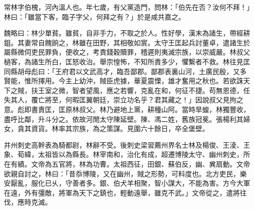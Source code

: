 
\begin{pinyinscope}
常林字伯槐，河內溫人也。年七歲，有父黨造門，問林：「伯先在否？汝何不拜！」林曰：「雖當下客，臨子字父，何拜之有？」於是咸共嘉之。

魏略曰：林少單貧。雖貧，自非手力，不取之於人。性好學，漢末為諸生，帶經耕鉏。其妻常自餽餉之，林雖在田野，其相敬如賔。太守王匡起兵討董卓，遣諸生於屬縣微伺吏民罪負，便收之，考責錢穀贖罪，稽遲則夷滅宗族，以崇威嚴。林叔父檛客，為諸生所白，匡怒收治。舉宗惶怖，不知所責多少，懼繫者不救。林往見匡同縣胡母彪曰：「王府君以文武高才，臨吾鄙郡。鄙郡表裏山河，土廣民殷，又多賢能，惟所擇用。今主上幼沖，賊臣虎據，華夏震慄，雄才奮用之秋也。若欲誅天下之賊，扶王室之微，智者望風，應之若響，克亂在和，何征不捷。苟無恩德，任失其人，覆亡將至，何暇匡翼朝廷，崇立功名乎？君其藏之！」因說叔父見拘之意。彪即書責匡，匡原林叔父。林乃避地上黨，耕種山阿。當時旱蝗，林獨豐收，盡呼比鄰，升斗分之。依故河閒太守陳延壁。陳、馮二姓，舊族冠冕。張楊利其婦女，貪其資貨。林率其宗族，為之策謀。見圍六十餘日，卒全堡壁。

并州刺史高幹表為騎都尉，林辭不受。後刺史梁習薦州界名士林及楊俊、王淩、王象、荀緯，太祖皆以為縣長。林宰南和，治化有成，超遷博陵太守、幽州刺史，所在有績。文帝為五官將，林為功曹。太祖西征，田銀、蘇伯反，幽、兾扇動。文帝欲親自討之，林曰：「昔忝博陵，又在幽州，賊之形勢，可料度也。北方吏民，樂安厭亂，服化已乆，守善者多。銀、伯犬羊相聚，智小謀大，不能為害。方今大軍在遠，外有彊敵，將軍為天下之鎮也，輕動遠舉，雖克不武。」文帝從之，遣將往伐，應時克滅。


\end{pinyinscope}
